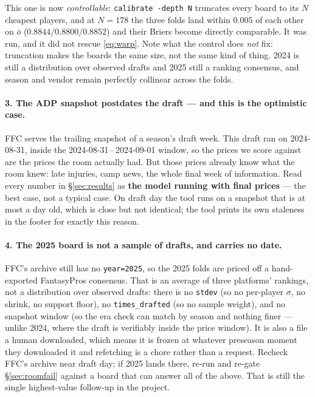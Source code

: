 \documentclass[10pt,a4paper]{article}
\theoremstyle{plain}
\theoremstyle{definition}
\theoremstyle{remark}
\newcommand{\code}[1]{\texttt{\small #1}}
\begin{document}
This one is now \emph{controllable}: \code{calibrate -depth N} truncates every board to
its $N$ cheapest players, and at $N = 178$ the three folds land within $0.005$ of each
other on $\bar o$ ($0.8844 / 0.8800 / 0.8852$) and their Briers become directly
comparable. It was run, and it did not rescue \eqref{eq:warp}. Note what the control does
\emph{not} fix: truncation makes the boards the same size, not the same kind of thing.
2024 is still a distribution over observed drafts and 2025 still a ranking consensus, and
season and vendor remain perfectly collinear across the folds.

\paragraph{3. The ADP snapshot postdates the draft --- and this is the optimistic case.}
FFC serves the trailing snapshot of a season's draft week. This draft ran on 2024-08-31,
inside the 2024-08-31\,--\,2024-09-01 window, so the prices we score against are the
prices the room actually had. But those prices already know what the room knew: late
injuries, camp news, the whole final week of information. Read every number in
\S\ref{sec:results} as \textbf{the model running with final prices} --- the best case,
not a typical case. On draft day the tool runs on a snapshot that is at most a day old,
which is close but not identical; the tool prints its own staleness in the footer for
exactly this reason.

\paragraph{4. The 2025 board is not a sample of drafts, and carries no date.}
FFC's archive still has no \code{year=2025}, so the 2025 folds are priced off a
hand-exported FantasyPros consensus. That is an average of three platforms' rankings, not
a distribution over observed drafts: there is no \code{stdev} (so no per-player $\sigma$,
no shrink, no support floor), no \code{times\_drafted} (so no sample weight), and no
snapshot window (so the era check can match by season and nothing finer --- unlike 2024,
where the draft is verifiably inside the price window). It is also a file a human
downloaded, which means it is frozen at whatever preseason moment they downloaded it and
refetching is a chore rather than a request. Recheck FFC's archive near draft day; if 2025
lands there, re-run and re-gate \S\ref{sec:roomfail} against a board that can answer all
of the above. That is still the single highest-value follow-up in the project.
\end{document}
